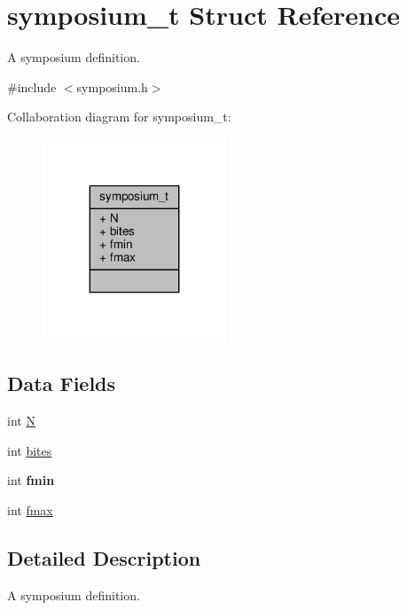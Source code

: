 \hypertarget{structsymposium__t}{}\section{symposium\+\_\+t Struct Reference}
\label{structsymposium__t}


A symposium definition.  




{\ttfamily \#include $<$symposium.\+h$>$}



Collaboration diagram for symposium\+\_\+t\+:
\nopagebreak
\begin{figure}[H]
\begin{center}
\leavevmode
\includegraphics[width=155pt]{structsymposium__t__coll__graph}
\end{center}
\end{figure}
\subsection*{Data Fields}
\begin{DoxyCompactItemize}
\item 
int \hyperlink{structsymposium__t_a4e366c10036b2d89ebc2dbcdefba8999}{N}
\item 
int \hyperlink{structsymposium__t_a9ee1b978200b8a4b7c30b170c1f20643}{bites}
\item 
int {\bfseries fmin}\hypertarget{structsymposium__t_ab7af5af3a92d6c03bf916571a09d6aed}{}\label{structsymposium__t_ab7af5af3a92d6c03bf916571a09d6aed}

\item 
int \hyperlink{structsymposium__t_a038b49a350225fed31d5c148a9147ec6}{fmax}
\end{DoxyCompactItemize}


\subsection{Detailed Description}
A symposium definition. 

